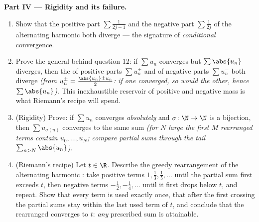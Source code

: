 \begin{problem}[{Weekend problem --- $H_n = \ln n + \gamma +
\frac{1}{2n} + O(n^{-2})$, and rearranging $1 - \frac12 +
\frac13 - \dots$ to $\frac{\ln 2}{2}$}]
\medskip
\noindent\textbf{Part IV --- Rigidity and its failure.}
\begin{enumerate}[resume]
  \item Show that the positive part $\sum \frac{1}{2j-1}$ and
        the negative part $\sum \frac{1}{2j}$ of the alternating
        harmonic  both diverge --- the signature of
        \emph{conditional} convergence.
  \item Prove the general  behind question 12: if
        $\sum u_n$ converges but $\sum \abs{u_n}$ diverges, then
        the  of positive parts $\sum u_n^+$ and of
        negative parts $\sum u_n^-$ both diverge \emph{(from
        $u_n^\pm = \frac{\abs{u_n} \pm u_n}{2}$: if one
        converged, so would the other, hence $\sum\abs{u_n}$)}.
        This inexhaustible reservoir of positive and negative
        mass is what Riemann's recipe will spend.
  \item (Rigidity) Prove: if $\sum u_n$ converges
        \emph{absolutely} and $\sigma \colon \N \to \N$ is a
        bijection, then $\sum u_{\sigma(n)}$ converges to the
        same sum \emph{(for $N$ large the first $M$ rearranged
        terms contain $u_0, \dots, u_N$; compare partial sums
        through the tail $\sum_{n > N}\abs{u_n}$)}.
  \item (Riemann's recipe) Let $t \in \R$. Describe the greedy
        rearrangement of the alternating harmonic : take
        positive terms $1, \frac13, \frac15, \dots$ until the
        partial sum first exceeds $t$, then negative terms
        $-\frac12, -\frac14, \dots$ until it first drops below
        $t$, and repeat. Show that every term is used exactly
        once, that after the first crossing the partial sums
        stay within the last used term of $t$, and conclude that
        the rearranged  converges to $t$: \emph{any}
        prescribed sum is attainable.
\end{enumerate}


\end{problem}
